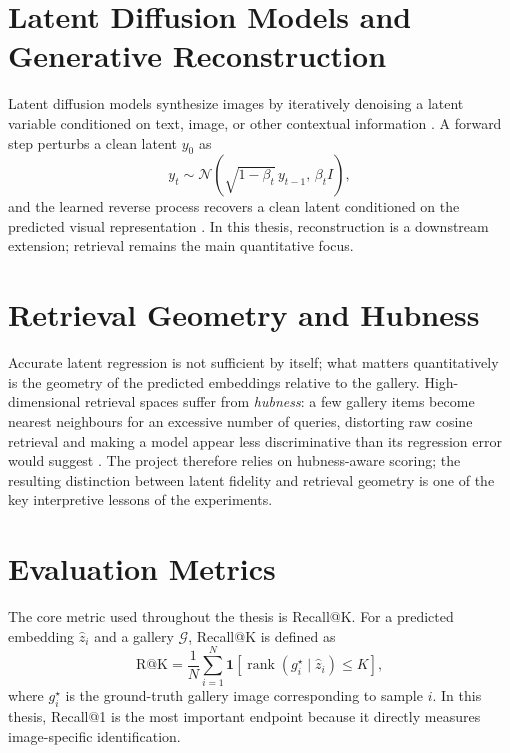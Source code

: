 \section{Latent Diffusion Models and Generative Reconstruction}

Latent diffusion models synthesize images by iteratively denoising a latent variable conditioned on text, image, or other contextual information \cite{Rombach2022}. A forward step perturbs a clean latent $y_0$ as
\begin{equation}
y_t \sim \mathcal{N}\!\left(\sqrt{1-\beta_t}\, y_{t-1},\, \beta_t I\right),
\label{eq:diffusion_forward}
\end{equation}
and the learned reverse process recovers a clean latent conditioned on the predicted visual representation \cite{Takagi2023,Ozcelik2023}. In this thesis, reconstruction is a downstream extension; retrieval remains the main quantitative focus.

\section{Retrieval Geometry and Hubness}

Accurate latent regression is not sufficient by itself; what matters quantitatively is the geometry of the predicted embeddings relative to the gallery. High-dimensional retrieval spaces suffer from \emph{hubness}: a few gallery items become nearest neighbours for an excessive number of queries, distorting raw cosine retrieval and making a model appear less discriminative than its regression error would suggest \cite{Conneau2018}. The project therefore relies on hubness-aware scoring; the resulting distinction between latent fidelity and retrieval geometry is one of the key interpretive lessons of the experiments.

\section{Evaluation Metrics}

The core metric used throughout the thesis is Recall@K. For a predicted embedding $\hat{z}_i$ and a gallery $\mathcal{G}$, Recall@K is defined as
\begin{equation}
\mathrm{R@K} = \frac{1}{N} \sum_{i=1}^{N} \mathbf{1}\left[\operatorname{rank}(g_i^\star \mid \hat{z}_i) \leq K\right],
\label{eq:recall_at_k}
\end{equation}
where $g_i^\star$ is the ground-truth gallery image corresponding to sample $i$. In this thesis, Recall@1 is the most important endpoint because it directly measures image-specific identification.

